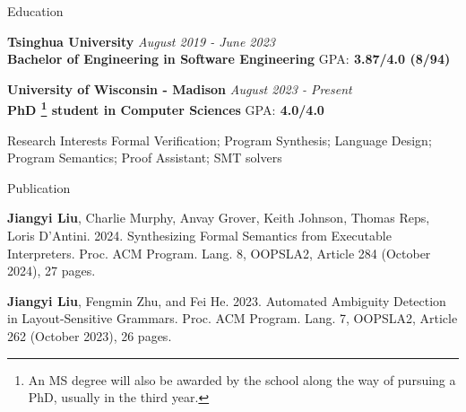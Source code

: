\documentclass{resume} %
\newcommand{\Jun}{June }
\newcommand{\Aug}{August }
\begin{document}

\begin{rSection}{Education}


{\bf Tsinghua University} \hfill {\em \Aug 2019 - \Jun 2023} 
\\{\bf Bachelor of Engineering in Software Engineering} \hfill{GPA:\bf{ 3.87/4.0} (8/94)}

{\bf University of Wisconsin - Madison} \hfill {\em \Aug 2023 - Present} 
  \\{\bf PhD \footnote{An MS degree will also be awarded by the school along the way of pursuing a PhD, usually in the third year.} student in Computer Sciences} \hfill{GPA:\bf{ 4.0/4.0}}



\end{rSection}

\begin{rSection}{Research Interests}
Formal Verification; Program Synthesis; Language Design; Program Semantics; Proof Assistant; SMT solvers

\end{rSection}

\begin{rSection}{Publication}
  

  \textbf{Jiangyi Liu}, Charlie Murphy, Anvay Grover, Keith Johnson, Thomas Reps, Loris D'Antini. 2024. Synthesizing Formal Semantics from Executable Interpreters. Proc. ACM Program. Lang. 8, OOPSLA2, Article 284 (October 2024), 27 pages.

  \textbf{Jiangyi Liu}, Fengmin Zhu, and Fei He. 2023. Automated Ambiguity Detection in Layout-Sensitive Grammars. Proc. ACM Program. Lang. 7, OOPSLA2, Article 262 (October 2023), 26 pages.
 
    
\end{rSection}
\end{document}
